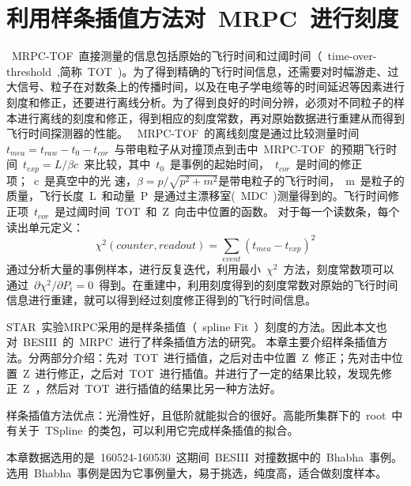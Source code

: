 \chapter{利用样条插值方法对~MRPC~进行刻度}

~MRPC-TOF~直接测量的信息包括原始的飞行时间和过阈时间（~time-over-threshold~,简称~TOT~)。为了得到精确的飞行时间信息，还需要对时幅游走、过大信号、粒子在对数条上的传播时间，以及在电子学电缆等的时间延迟等因素进行刻度和修正，还要进行离线分析。为了得到良好的时间分辨，必须对不同粒子的样本进行离线的刻度和修正，得到相应的刻度常数，再对原始数据进行重建从而得到飞行时间探测器的性能。
~MRPC-TOF~的离线刻度是通过比较测量时间~$t_{mea}=t_{raw}-t_{0}-t_{cor}$~与带电粒子从对撞顶点到击中~MRPC-TOF~的预期飞行时间~$t_{exp}=L/\beta c$~来比较，其中~$t_{0}$~是事例的起始时间，~$t_{cor}$~是时间的修正项；~c~是真空中的光
速，$\beta=p/\sqrt{p^2+m^2}$是带电粒子的飞行时间，~m~是粒子的质量，飞行长度~L~和动量~P~是通过主漂移室(~MDC~)测量得到的。飞行时间修正项~$t_{cor}$~是过阈时间~TOT~和~Z~向击中位置的函数。
对于每一个读数条，每个读出单元定义：
\begin{displaymath}
\chi^2(counter,readout)=\sum\limits_{event}(t_{mea}-t_{exp})^2
\end{displaymath}
通过分析大量的事例样本，进行反复迭代，利用最小~$\chi^2$~方法，刻度常数项可以通过~$\partial\chi^2/\partial P_{i}=0$~得到。在重建中，利用刻度得到的刻度常数对原始的飞行时间信息进行重建，就可以得到经过刻度修正得到的飞行时间信息。

STAR~实验MRPC采用的是样条插值（~spline Fit~）刻度的方法。因此本文也对~BESIII~的~MRPC~进行了样条插值方法的研究。
本章主要介绍样条插值方法。分两部分介绍：先对~TOT~进行插值，之后对击中位置~Z~修正；先对击中位置~Z~进行修正，之后对~TOT~进行插值。并进行了一定的结果比较，发现先修正~Z~，然后对~TOT~进行插值的结果比另一种方法好。

样条插值方法优点：光滑性好，且低阶就能拟合的很好。高能所集群下的~root~中有关于~TSpline~的类包，可以利用它完成样条插值的拟合。

本章数据选用的是~160524-160530~这期间~BESIII~对撞数据中的~Bhabha~事例。选用~Bhabha~事例是因为它事例量大，易于挑选，纯度高，适合做刻度样本。

